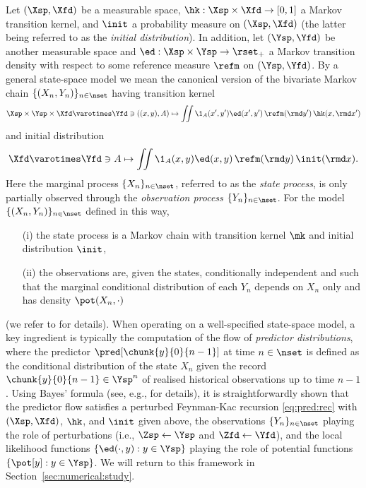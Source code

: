 \begin{example} \label{example:state:space:model}
Let $(\Xsp, \Xfd)$ be a measurable space, $\hk : \Xsp \times \Xfd \rightarrow [0, 1]$ a Markov transition kernel, and $\init$ a probability measure on $(\Xsp, \Xfd)$ (the latter being referred to as the \emph{initial distribution}). In addition, let $(\Ysp, \Yfd)$ be another measurable space and $\ed : \Xsp \times \Ysp \rightarrow \rset_+$ a Markov transition density with respect to some reference measure $\refm$ on $(\Ysp, \Yfd)$. By a general state-space model we mean the canonical version of the bivariate Markov chain $\{ (X_n, Y_n) \}_{n \in \nset}$ having transition kernel 
$$
    \Xsp \times \Ysp \times \Xfd \varotimes \Yfd \ni ((x, y), A) \mapsto \iint \1_A(x', y') \ed(x', y') \, \refm(\rmd y') \, \hk(x, \rmd x')
$$
and initial distribution 
$$
    \Xfd \varotimes \Yfd \ni A \mapsto \iint \1_A(x, y) \ed(x, y) \, \refm(\rmd y) \, \init(\rmd x).  
$$ 
Here the marginal process $\{ X_n \}_{n \in \nset}$, referred to as the \emph{state process}, is only partially observed through the \emph{observation process} $\{ Y_n \}_{n \in \nset}$. For the model  $\{ (X_n, Y_n) \}_{n \in \nset}$ defined in this way, 
\begin{itemize}
    \item[(i)] the state process is a Markov chain with transition kernel $\mk$ and initial distribution $\init$, 
    \item[(ii)] the observations are, given the states, conditionally independent and such that the marginal conditional distribution of each $Y_n$ depends on $X_n$ only and has density $\pot(X_n, \cdot)$
\end{itemize}
(we refer to \cite[Section~2.2]{cappe:moulines:ryden:2005} for details). When operating on a well-specified state-space model, a key ingredient is typically the computation of the flow of \emph{predictor distributions}, where the predictor $\pred[\chunk{y}{0}{n - 1}]$ at time $n \in \nset$ is defined as the conditional distribution of the state $X_n$ given the record $\chunk{y}{0}{n - 1} \in \Ysp^n$ of realised historical observations up to time $n - 1$. Using Bayes' formula (see, e.g., \cite[Section~3.2.2]{cappe:moulines:ryden:2005} for details), it is straightforwardly shown that the predictor flow satisfies a perturbed Feynman-Kac recursion \eqref{eq:pred:rec} with $(\Xsp, \Xfd)$, $\hk$, and $\init$ given above, the observations $\{ Y_n \}_{n \in \nset}$ playing the role of perturbations (i.e., $\Zsp \gets \Ysp$ and $\Zfd \gets \Yfd$), and the local likelihood functions $\{\ed(\cdot, y) : y \in \Ysp \}$ playing the role of potential functions $\{\pot[y] : y \in \Ysp\}$. We will return to this framework in Section~\ref{sec:numerical:study}. 
\end{example}

